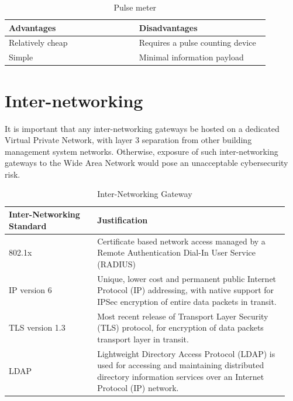 \documentclass[11pt, oneside]{article}   	%
\begin{document}
\begin{table}[h!]
	\caption{Pulse meter}
	\begin{center}
	\begin{tabular}{p{0.48\linewidth} | p{0.48\linewidth}}
	\hline
	Advantages&Disadvantages\\
	\hline
	Relatively cheap&Requires a pulse counting device\\
	Simple&Minimal information payload\\
	\end{tabular}
	\end{center}
	\label{Pulse Meter Option}
\end{table}

\clearpage

\section{Inter-networking}

It is important that any inter-networking gateways be hosted on a dedicated Virtual Private Network, with layer 3 separation from other building management system networks.
Otherwise, exposure of such inter-networking gateways to the Wide Area Network would pose an unacceptable cybersecurity risk.

\begin{table}[h!]
	\caption{Inter-Networking Gateway}
	\begin{center}
	\begin{tabular}{p{0.3\linewidth} | p{0.65\linewidth}}
	\hline
	Inter-Networking Standard&Justification\\
	\hline
	802.1x&Certificate based network access managed by a Remote Authentication Dial-In User Service (RADIUS)\\
	IP version 6&Unique, lower cost and permanent public Internet Protocol (IP) addressing, with native support for IPSec encryption of entire data packets in transit.\\
	TLS version 1.3&Most recent release of Transport Layer Security (TLS) protocol, for encryption of data packets transport layer in transit.\\
	LDAP&Lightweight Directory Access Protocol (LDAP) is used for accessing and maintaining distributed directory information services over an Internet Protocol (IP) network.\\
	\end{tabular}
	\end{center}
	\label{Pulse Meter Option}
\end{table}
\end{document}
